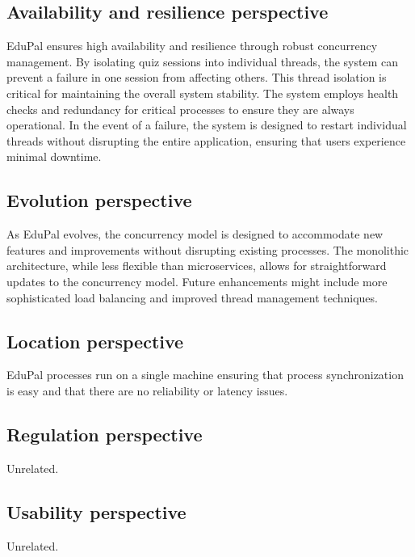 \subsection{Availability and resilience perspective}

EduPal ensures high availability and resilience through robust concurrency management. By isolating quiz sessions into individual threads, the system can prevent a failure in one session from affecting others. This thread isolation is critical for maintaining the overall system stability. The system employs health checks and redundancy for critical processes to ensure they are always operational. In the event of a failure, the system is designed to restart individual threads without disrupting the entire application, ensuring that users experience minimal downtime.

\subsection{Evolution perspective}

As EduPal evolves, the concurrency model is designed to accommodate new features and improvements without disrupting existing processes. The monolithic architecture, while less flexible than microservices, allows for straightforward updates to the concurrency model. Future enhancements might include more sophisticated load balancing and improved thread management techniques.

\subsection{Location perspective}

EduPal processes run on a single machine ensuring that process synchronization is easy and that there are no reliability or latency issues.

\subsection{Regulation perspective}

Unrelated.

\subsection{Usability perspective}

Unrelated.
